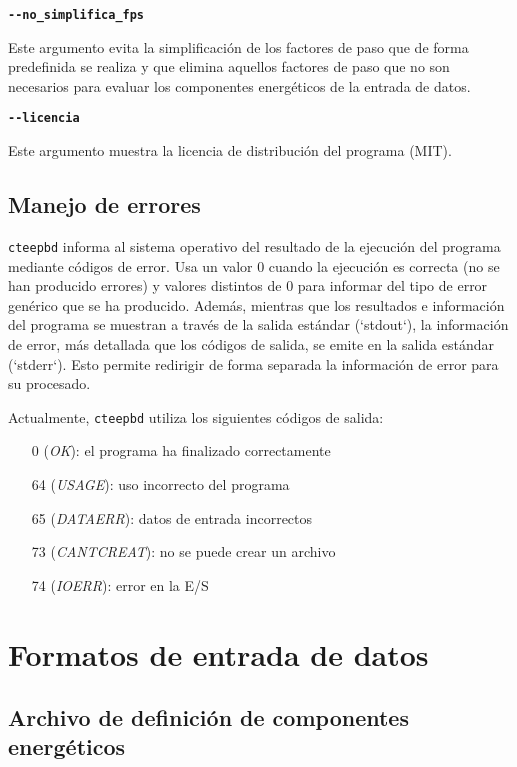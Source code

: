 \documentclass[10pt,notitlepage,oneside,a4paper]{article}
\begin{document}
\textbf{\texttt{-{}-no\_simplifica\_fps}}

Este argumento evita la simplificación de los factores de paso que de forma predefinida se realiza y que elimina aquellos factores de paso que no son necesarios para evaluar los componentes energéticos de la entrada de datos.

\textbf{\texttt{-{}-licencia}}

Este argumento muestra la licencia de distribución del programa (MIT).


\subsection{Manejo de errores}

\texttt{cteepbd} informa al sistema operativo del resultado de la ejecución del programa mediante códigos de error. Usa un valor 0 cuando la ejecución es correcta (no se han producido errores) y valores distintos de 0 para informar del tipo de error genérico que se ha producido. Además, mientras que los resultados e información del programa se muestran a través de la salida estándar (`stdout`), la información de error, más detallada que los códigos de salida, se emite en la salida estándar (`stderr`). Esto permite redirigir de forma separada la información de error para su procesado.

Actualmente, \texttt{cteepbd} utiliza los siguientes códigos de salida:

\begin{itemize}
\item[0] (\textit{OK}): el programa ha finalizado correctamente
\item[64] (\textit{USAGE}): uso incorrecto del programa
\item[65] (\textit{DATAERR}): datos de entrada incorrectos
\item[73] (\textit{CANTCREAT}): no se puede crear un archivo
\item[74] (\textit{IOERR}): error en la E/S
\end{itemize}

\clearpage
\newpage
\section{Formatos de entrada de datos}

\subsection{Archivo de definición de componentes energéticos}\label{sec:formatocomponentes}
\end{document}

